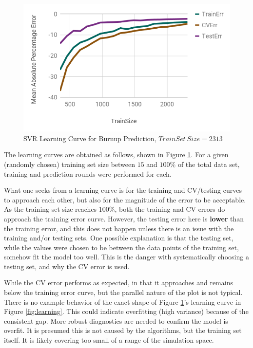 \begin{figure}[!htb]
    \centering
    \includegraphics[width=\linewidth]{./chapters/demo_method/lc1.png}
    \caption{\acrshort{SVR} Learning Curve for Burnup Prediction, $TrainSet\ Size = 2313$}
    \label{fig:lc1}
\end{figure}

The learning curves are obtained as follows, shown in Figure \ref{fig:lc1}.
For a given (randomly chosen) training set size between $15$ and $100\%$ of the
total data set, training and prediction rounds were performed for each. 

What one seeks from a learning curve is for the training and \gls{CV}/testing
curves to approach each other, but also for the magnitude of the error to be
acceptable. As the training set size reaches $100\%$, both the training and
\gls{CV} errors do approach the training error curve.  However, the testing
error here is \textbf{lower} than the training error, and this does not happen
unless there is an issue with the training and/or testing sets. One possible
explanation is that the testing set, while the values were chosen to be between
the data points of the training set, somehow fit the model too well. This is
the danger with systematically choosing a testing set, and why the \gls{CV}
error is used. 

While the \gls{CV} error performs as expected, in that it approaches and
remains below the training error curve, but the parallel nature of the plot is
not typical. There is no example behavior of the exact shape of Figure
\ref{fig:lc1}'s learning curve in Figure \ref{fig:learning}. This could
indicate overfitting (high variance) because of the consistent gap.  More
robust diagnostics are needed to confirm the model is overfit.  It is presumed
this is not caused by the algorithms, but the training set itself.  It is
likely covering too small of a range of the simulation space.

